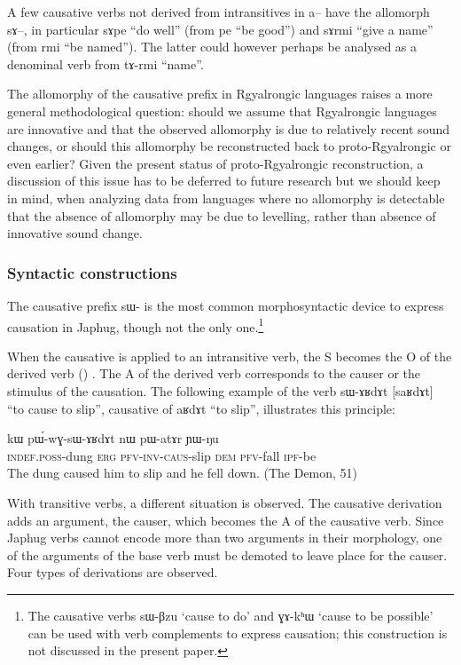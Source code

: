 \documentclass[oldfontcommands,oneside,a4paper,11pt]{article}
\newcommand{\ipa}[1]{{\phon \mbox{#1}}} %
\newcommand{\pfv}{\textsc{pfv}}
\newcommand{\caus}{\textsc{caus}}
\newcommand{\dem}{\textsc{dem}}
\newcommand{\erg}{\textsc{erg}}
\newcommand{\inv}{\textsc{inv}}
\newcommand{\ipf}{\textsc{ipf}}
\begin{document}
A few causative verbs not derived from intransitives in \ipa{a}-- have the allomorph \ipa{sɤ}--, in particular \ipa{sɤpe} ``do well'' (from \ipa{pe} ``be good'') and \ipa{sɤrmi} ``give a name'' (from \ipa{rmi} ``be named''). The latter could however perhaps be analysed as a denominal verb from \ipa{tɤ-rmi} ``name''.

The allomorphy of the causative prefix in Rgyalrongic languages raises a more general methodological question: should we assume that Rgyalrongic languages are innovative and that the observed allomorphy is due to relatively recent sound changes, or should this allomorphy be reconstructed back to proto-Rgyalrongic or even earlier? Given the present status of proto-Rgyalrongic reconstruction, a discussion of this issue has to be deferred to future research but we should keep in mind, when analyzing data from languages where no allomorphy is detectable that the absence of allomorphy may be due to levelling, rather than absence of innovative sound change.

\subsubsection{Syntactic constructions} \label{subsub:causation}
The causative prefix \ipa{sɯ-} is the most common morphosyntactic device to express causation in Japhug, though not the only one.\footnote{The causative verbs \ipa{sɯ-βzu} `cause to do' and \ipa{ɣɤ-kʰɯ} `cause to be possible' can be used with verb complements to express causation; this construction is not discussed in the present paper. }

When the causative is applied to an intransitive verb, the S becomes the O of the derived verb (\citealt[45]{dixon00causative}) . The A of the derived verb corresponds to the causer  or the stimulus of the causation.  The following example of the verb \ipa{sɯ-ɤʁdɤt} [\ipa{saʁdɤt}] ``to cause to slip'', causative of \ipa{aʁdɤt} ``to slip'', illustrates this principle:
\begin{exe}
\ex
\gll \ipa{tɯ-qe} 	\ipa{kɯ} 	\ipa{pɯ́-wɣ-sɯ-ɤʁdɤt} 	\ipa{nɯ} 	\ipa{pɯ-atɤr} 	\ipa{ɲɯ-ŋu} \\
\textsc{indef.poss}-dung \erg{} \pfv{}-\inv{}-\caus{}-slip \dem{} \pfv{}-fall \ipf{}-be \\
 \glt The dung caused him to slip and he fell down. (The Demon, 51)
\end{exe} 


With transitive verbs, a different situation is observed. The causative derivation adds an argument, the causer, which becomes the A of the causative verb. Since Japhug verbs cannot encode more than two arguments in their morphology, one of the arguments of the base verb must be demoted to leave place for the causer.  Four types of derivations are observed.
\end{document}
